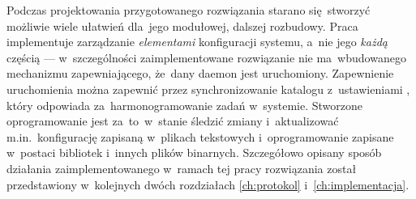 \documentclass[thesis]{subfiles}
\begin{document}
Podczas projektowania przygotowanego rozwiązania starano się~stworzyć możliwie wiele ułatwień dla~jego modułowej, dalszej rozbudowy. Praca implementuje zarządzanie \emph{elementami} konfiguracji systemu, a~nie jego \emph{każdą} częścią --- w~szczególności zaimplementowane rozwiązanie nie ma~wbudowanego mechanizmu zapewniającego, że~dany \gls{daemon} jest uruchomiony. Zapewnienie uruchomienia  można zapewnić przez synchronizowanie katalogu z~ustawieniami , który odpowiada za~harmonogramowanie zadań w~systemie. Stworzone oprogramowanie jest za~to~w~stanie śledzić zmiany i~aktualizować m.in.~konfigurację zapisaną w~plikach tekstowych i~oprogramowanie zapisane w~postaci bibliotek i~innych plików binarnych. Szczegółowo opisany sposób działania zaimplementowanego w~ramach tej pracy rozwiązania został przedstawiony w~kolejnych dwóch rozdziałach \ref{ch:protokol} i~\ref{ch:implementacja}.
\end{document}

